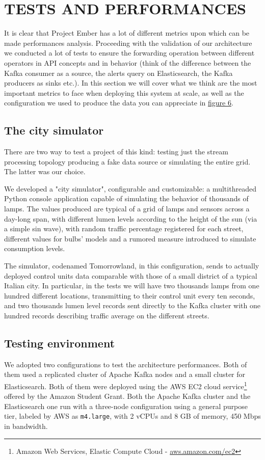 \section{TESTS AND PERFORMANCES}
It is clear that Project Ember has a lot of different metrics upon which can be made performances analysis. Proceeding with the validation of our architecture we conducted a lot of tests to ensure the forwarding operation between different operators in API concepts and in behavior (think of the difference between the Kafka consumer as a source, the alerts query on Elasticsearch, the Kafka producers as sinks etc.). In this section we will cover what we think are the most important metrics to face when deploying this system at scale, as well as the configuration we used to produce the data you can appreciate in \hyperref[fig:ember_metrics]{figure 6}.

\subsection{The city simulator}
There are two way to test a project of this kind: testing just the stream processing topology producing a fake data source or simulating the entire grid. The latter was our choice.

We developed a "city simulator", configurable and customizable: a multithreaded Python console application capable of simulating the behavior of thousands of lamps. The values produced are typical of a grid of lamps and sensors across a day-long span, with different lumen levels according to the height of the sun (via a simple sin wave), with random traffic percentage registered for each street, different values for bulbs' models and a rumored measure introduced to simulate consumption levels.

The simulator, codenamed Tomorrowland, in this configuration, sends to actually deployed control units data comparable with those of a small district of a typical Italian city. In particular, in the tests we will have two thousands lamps from one hundred different locations, transmitting to their control unit every ten seconds, and two thousands lumen level records sent directly to the Kafka cluster with one hundred records describing traffic average on the different streets. 

\subsection{Testing environment}
We adopted two configurations to test the architecture performances. Both of them used a replicated cluster of Apache Kafka nodes and a small cluster for Elasticsearch. Both of them were deployed using the AWS EC2 cloud service\footnote{Amazon Web Services, Elastic Compute Cloud - \url{aws.amazon.com/ec2}} offered by the Amazon Student Grant. Both the Apache Kafka cluster and the Elasticsearch one run with a three-node configuration using a general purpose tier, labeled by AWS as \texttt{m4.large}, with 2 vCPUs and 8 GB of memory, 450 Mbps in bandwidth. 

